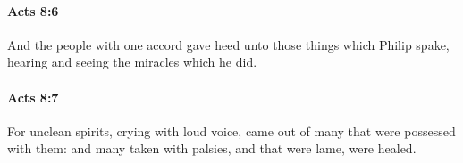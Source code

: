 		\paragraph{Acts 8:6} %
			\label{ACTS-8-6}

			And the people with one accord gave heed unto those things which Philip spake, hearing and seeing the miracles which he did.

			\begin{framed}
			\scriptsize
				\begin{compactdesc}
					\item[SBLG] 
				\end{compactdesc}
			\end{framed}

		\paragraph{Acts 8:7} %
			\label{ACTS-8-7}

			For unclean spirits, crying with loud voice, came out of many that were possessed with them: and many taken with palsies, and that were lame, were healed.

